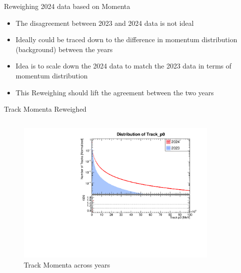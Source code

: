 \begin{frame}{Reweighing 2024 data based on Momenta}
    \begin{itemize}
        \item The disagreement between 2023 and 2024 data is not ideal
        \item Ideally could be traced down to the difference in momentum distribution (background) between the years
        \item Idea is to scale down the 2024 data to match the 2023 data in terms of momentum distribution
        \item This Reweighing should lift the agreement between the two years
    \end{itemize}
\end{frame}

\begin{frame}{Track Momenta Reweighed}
    \begin{columns}
        \begin{column}{0.5\linewidth}
            \begin{figure}
                \includegraphics[width=\linewidth]{./ReweighedPlots/Track_p0_ratio.pdf}
                \caption{Track Momenta across years}
            \end{figure}
        \end{column}
        \begin{column}{0.5\linewidth}
            \begin{figure}

\end{figure}
\end{column}
\end{columns}
\end{frame}
